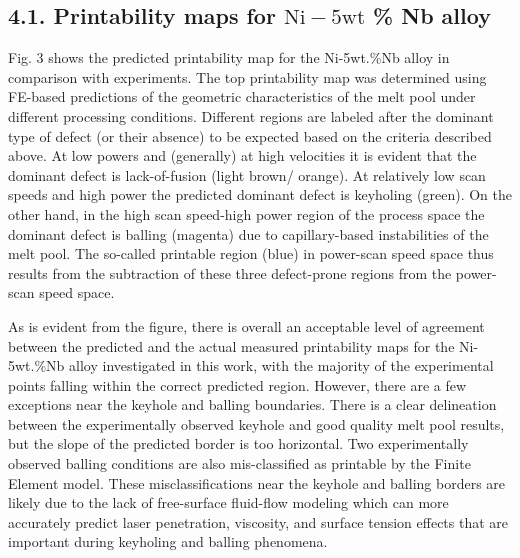 \documentclass[10pt]{article}
\begin{document}
\subsection*{4.1. Printability maps for $\mathrm{Ni}-5 \mathrm{wt}$ \% Nb alloy}
Fig. 3 shows the predicted printability map for the Ni-5wt.\%Nb alloy in comparison with experiments. The top printability map was determined using FE-based predictions of the geometric characteristics of the melt pool under different processing conditions. Different regions are labeled after the dominant type of defect (or their absence) to be expected based on the criteria described above. At low powers and (generally) at high velocities it is evident that the dominant defect is lack-of-fusion (light brown/ orange). At relatively low scan speeds and high power the predicted dominant defect is keyholing (green). On the other hand, in the high scan speed-high power region of the process space the dominant defect is balling (magenta) due to capillary-based instabilities of the melt pool. The so-called printable region (blue) in power-scan speed space thus results from the subtraction of these three defect-prone regions from the power-scan speed space.

As is evident from the figure, there is overall an acceptable level of agreement between the predicted and the actual measured printability maps for the Ni-5wt.\%Nb alloy investigated in this work, with the majority of the experimental points falling within the correct predicted region. However, there are a few exceptions near the keyhole and balling boundaries. There is a clear delineation between the experimentally observed keyhole and good quality melt pool results, but the slope of the predicted border is too horizontal. Two experimentally observed balling conditions are also mis-classified as printable by the Finite Element model. These misclassifications near the keyhole and balling borders are likely due to the lack of free-surface fluid-flow modeling which can more accurately predict laser penetration, viscosity, and surface tension effects that are important during keyholing and balling phenomena.
\end{document}

